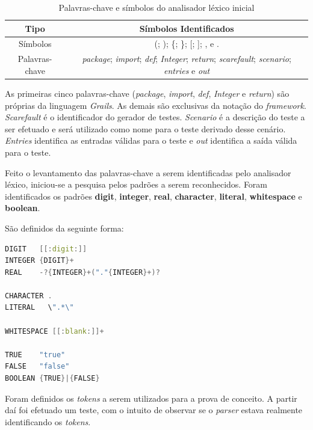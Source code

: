 \begin{table}[h]
  \tiny
  \centering
  \caption{Palavras-chave e símbolos do analisador léxico inicial}
  \label{keywords}
  \begin{tabular}{| c | c |}
    \hline
    Tipo & Símbolos Identificados\\ \hline
     Símbolos & (;  );  \{;  \};  [;  ];  , e . \\
     Palavras-chave &   \textit{package}; \textit{import}; \textit{def}; \textit{Integer}; \textit{return}; \textit{scarefault}; \textit{scenario}; \textit{entries} e \textit{out} \\ \hline
  \end{tabular}
\end{table}
\par
\indent As primeiras cinco palavras-chave (\textit{package}, \textit{import},
\textit{def}, \textit{Integer} e \textit{return}) são próprias da linguagem
\textit{Grails}. As demais são exclusivas da notação do \textit{framework}.
\textit{Scarefault} é o identificador do gerador de testes. \textit{Scenario}
é a descrição do teste a ser efetuado e será utilizado como nome para o teste
derivado desse cenário. \textit{Entries} identifica as entradas válidas para o
teste e \textit{out} identifica a saída válida para o teste.
\par
\indent Feito o levantamento das palavras-chave a serem identificadas pelo
analisador léxico, iniciou-se a pesquisa pelos padrões a serem reconhecidos.
Foram identificados os padrões \textbf{digit}, \textbf{integer}, \textbf{real},
\textbf{character}, \textbf{literal}, \textbf{whitespace} e \textbf{boolean}.
\par
\indent São definidos da seguinte forma:
\begin{lstlisting}[language=C++, label=pattern-nominate, caption=Padrões Nominados]
DIGIT   [[:digit:]]
INTEGER {DIGIT}+
REAL    -?{INTEGER}+("."{INTEGER}+)?

CHARACTER .
LITERAL   \".*\"

WHITESPACE [[:blank:]]+

TRUE    "true"
FALSE   "false"
BOOLEAN {TRUE}|{FALSE}
\end{lstlisting}
\par
\indent Foram definidos os \textit{tokens} a serem utilizados para a prova de
conceito. A partir daí foi efetuado um teste, com o intuito de observar se o
\textit{parser} estava realmente identificando os \textit{tokens}.
\par
